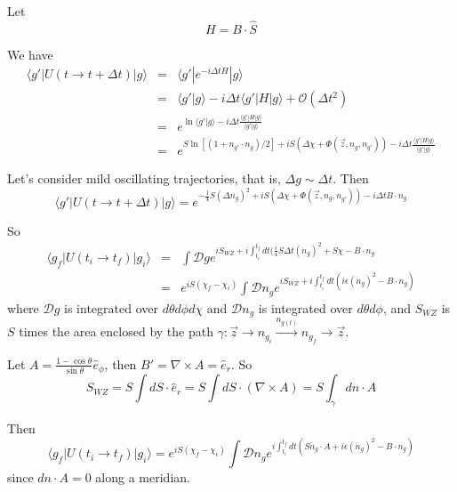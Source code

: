 \documentclass[12pt]{book}
\begin{document}
	Let
	\begin{equation}
		H=B\cdot \hat S
	\end{equation}
	
	We have
	\begin{eqnarray}
		\langle g'|U(t\rightarrow t+\Delta t)|g\rangle&=&\langle g'|e^{-i\Delta tH}|g\rangle\\
		&=&\langle g'|g\rangle-i\Delta t\langle g'|H|g\rangle+\mathcal O(\Delta t^2)\\
		&=&e^{\ln \langle g'|g\rangle-i\Delta t\frac{\langle g'|H|g\rangle}{\langle g'|g\rangle}}\\
		&=&e^{S\ln[(1+n_{g'}\cdot n_g)/2]+iS(\Delta\chi+\Phi(\vec z,n_g,n_{g'}))-i\Delta t\frac{\langle g'|H|g\rangle}{\langle g'|g\rangle}}
	\end{eqnarray}
	
	Let's consider mild oscillating trajectories, that is, $\Delta g\sim \Delta t$. Then
	\begin{equation}
		\langle g'|U(t\rightarrow t+\Delta t)|g\rangle=e^{-\frac 14S (\Delta n_g)^2+iS(\Delta\chi+\Phi(\vec z,n_g,n_{g'}))-i\Delta tB\cdot n_g}
	\end{equation}
	
	So
	\begin{eqnarray}
		\langle g_f|U(t_i\rightarrow t_f)|g_i\rangle
		&=&\int \mathcal D g e^{iS_{WZ}+i\int_{t_i}^{t_f}dt(\frac i4S\Delta t (\dot n_g)^2+S\dot\chi-B\cdot n_g}\\
		&=&e^{iS(\chi_f-\chi_i)}\int \mathcal D n_g e^{iS_{WZ}+i\int_{t_i}^{t_f}dt(i\epsilon (\dot n_g)^2-B\cdot n_g)}
	\end{eqnarray}
	where $\mathcal D g$ is integrated over $d\theta d\phi d\chi$ and $\mathcal D n_g$ is integrated over $d\theta d\phi $, and $S_{WZ}$ is $S$ times the area enclosed by the path $\gamma:\vec z\rightarrow n_{g_i}\overset{n_{g(t)}}{\longrightarrow} n_{g_f}\rightarrow\vec z$.
	
	Let $A=\frac{1-\cos\theta}{\sin\theta}\hat e_{\phi}$, then $B'=\nabla\times A=\hat e_r$. So
	\begin{equation}
		S_{WZ}=S\int dS\cdot \hat e_r=S\int dS\cdot(\nabla\times A)=S\int _\gamma dn\cdot A
	\end{equation}
	
	Then
	\begin{equation}
		\langle g_f|U(t_i\rightarrow t_f)|g_i\rangle=e^{iS(\chi_f-\chi_i)}\int \mathcal D n_g e^{i\int_{t_i}^{t_f}dt(S\dot n_g\cdot A+i\epsilon (\dot n_g)^2-B\cdot n_g)}
	\end{equation}
	since $dn\cdot A=0$ along a meridian. 
	
\end{document}
